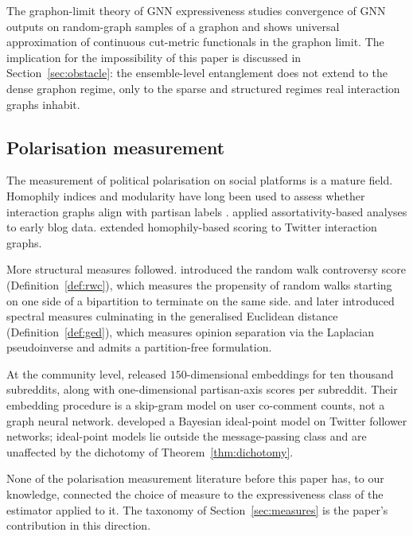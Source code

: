 The graphon-limit theory of GNN expressiveness \citep{KerivenPeyre2020,
RuizChamonRibeiro2021} studies convergence of GNN outputs on
random-graph samples of a graphon and shows universal approximation
of continuous cut-metric functionals in the graphon limit. The
implication for the impossibility of this paper is discussed in
Section~\ref{sec:obstacle}: the ensemble-level entanglement does not
extend to the dense graphon regime, only to the sparse and
structured regimes real interaction graphs inhabit.

\subsection{Polarisation measurement}

The measurement of political polarisation on social platforms is a
mature field. Homophily indices and modularity have long been used to
assess whether interaction graphs align with partisan labels
\citep{Newman2003, Newman2004}. \citet{AdamicGlance2005} applied assortativity-based analyses to
early blog data. \citet{ConoverPolBlogs2011} extended homophily-based
scoring to Twitter interaction graphs.

More structural measures followed. \citet{Garimella18} introduced the
random walk controversy score (Definition~\ref{def:rwc}), which measures the
propensity of random walks starting on one side of a bipartition to
terminate on the same side. \citet{Hohmann2016} and later
\citet{HohmannGED2023} introduced spectral measures culminating in
the generalised Euclidean distance (Definition~\ref{def:ged}), which measures
opinion separation via the Laplacian pseudoinverse and admits a
partition-free formulation.

At the community level, \citet{WallerAnderson2021} released
$150$-dimensional embeddings for ten thousand subreddits, along with
one-dimensional partisan-axis scores per subreddit. Their embedding
procedure is a skip-gram model on user co-comment counts, not a
graph neural network. \citet{Barbera2015} developed a Bayesian
ideal-point model on Twitter follower networks; ideal-point models
lie outside the message-passing class and are unaffected by the
dichotomy of Theorem~\ref{thm:dichotomy}.

None of the polarisation measurement literature before this paper
has, to our knowledge, connected the choice of measure to the
expressiveness class of the estimator applied to it. The taxonomy
of Section~\ref{sec:measures} is the paper's contribution in this
direction.


